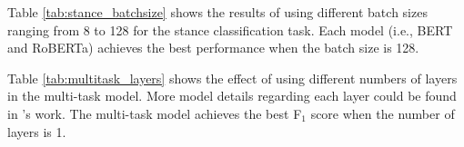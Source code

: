\documentclass[11pt]{article}
\begin{document}
Table \ref{tab:stance_batchsize} shows the results of using different batch sizes ranging from 8 to 128 for the stance classification task. Each model (i.e., BERT and RoBERTa) achieves the best performance when the batch size is 128. 



\begin{table}[H]
	\centering
{}
\caption{Results of different batch sizes for stance classification task.}
	\label{tab:stance_batchsize}
\end{table}



Table \ref{tab:multitask_layers} shows the effect of using different numbers of layers in the multi-task model. More model details regarding each layer could be found in \cite{cheng2021argument}'s work. The multi-task model achieves the best F$_1$ score when the number of layers is 1.


\begin{table}[H]
	\centering
{}
\caption{Effect of different numbers of layers used in the multi-task model.}
	\label{tab:multitask_layers}
\end{table}
\end{document}
